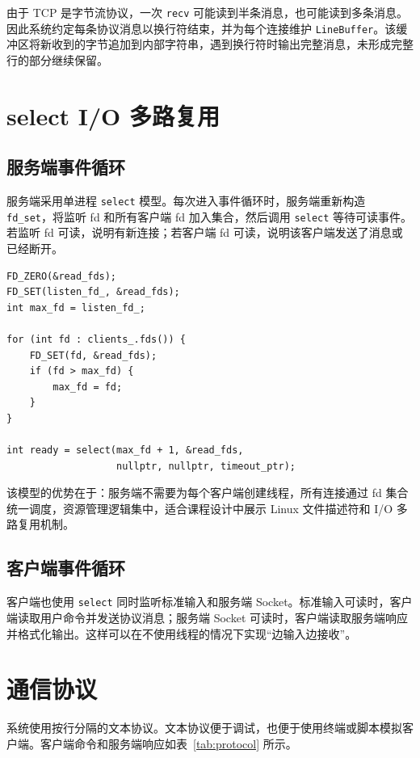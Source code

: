 \documentclass[UTF8,zihao=5,twocolumn]{ctexart}
\newcommand{\code}[1]{\texttt{#1}}
\begin{document}
由于 TCP 是字节流协议，一次 \code{recv} 可能读到半条消息，也可能读到多条消息。因此系统约定每条协议消息以换行符结束，并为每个连接维护 \code{LineBuffer}。该缓冲区将新收到的字节追加到内部字符串，遇到换行符时输出完整消息，未形成完整行的部分继续保留。

\section{select I/O 多路复用}

\subsection{服务端事件循环}

服务端采用单进程 \code{select} 模型。每次进入事件循环时，服务端重新构造 \code{fd\_set}，将监听 fd 和所有客户端 fd 加入集合，然后调用 \code{select} 等待可读事件。若监听 fd 可读，说明有新连接；若客户端 fd 可读，说明该客户端发送了消息或已经断开。

\begin{lstlisting}[style=cppstyle,caption={服务端 select 主循环片段},label={lst:server-select}]
FD_ZERO(&read_fds);
FD_SET(listen_fd_, &read_fds);
int max_fd = listen_fd_;

for (int fd : clients_.fds()) {
    FD_SET(fd, &read_fds);
    if (fd > max_fd) {
        max_fd = fd;
    }
}

int ready = select(max_fd + 1, &read_fds,
                   nullptr, nullptr, timeout_ptr);
\end{lstlisting}

该模型的优势在于：服务端不需要为每个客户端创建线程，所有连接通过 fd 集合统一调度，资源管理逻辑集中，适合课程设计中展示 Linux 文件描述符和 I/O 多路复用机制。

\subsection{客户端事件循环}

客户端也使用 \code{select} 同时监听标准输入和服务端 Socket。标准输入可读时，客户端读取用户命令并发送协议消息；服务端 Socket 可读时，客户端读取服务端响应并格式化输出。这样可以在不使用线程的情况下实现“边输入边接收”。

\section{通信协议}

系统使用按行分隔的文本协议。文本协议便于调试，也便于使用终端或脚本模拟客户端。客户端命令和服务端响应如表~\ref{tab:protocol} 所示。
\end{document}
